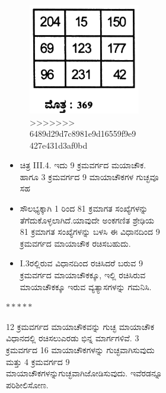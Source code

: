 \begin{figure}[H]
\begin{figure}[H]
\begin{figure}[h]
\begin{figure}[h]
\includegraphics[scale=.8]{src/figures/chap3/fig3.32.jpg}
>>>>>>> 6489d29d7c8981e9d16559f9e9427e431d3af0bd
\end{figure}

\begin{itemize}
	\item ಚಿತ್ರ  III.4. ಇದು 9 ಕ್ರಮವರ್ಗದ ಮಯಾಚೌಕ. ಹಾಗೂ 3 ಕ್ರಮವರ್ಗದ 9 ಮಾಯಾಚೌಕಗಳ ಗುಚ್ಛವೂ ಸಹ
	\item ಸೌಲಭ್ಯಕ್ಕಾಗಿ 1 ರಿಂದ 81 ಕ್ರಮಾಗತ ಸಂಖ್ಯೆಗಳನ್ನು ತೆಗೆದುಕೊಳ್ಳಲಾಗಿದೆ.\break ಯಾವುದೇ ಅಂಕಗಣಿತ ಶ್ರೇಢಿಯ 81 ಕ್ರಮಾಗತ ಸಂಖ್ಯೆಗಳನ್ನು ಬಳಸಿ ಈ ವಿಧಾನ\-ದಿಂದ 9 ಕ್ರಮವರ್ಗದ ಮಾಯಾಚೌಕ ರಚಿಸಬಹುದು.
	\item I.3ರಲ್ಲಿರುವ ವಿಧಾನದಿಂದ ರಚಿಸಿದರೆ ಬರುವ 9 ಕ್ರಮವರ್ಗದ ಮಾಯಾಚೌಕಕ್ಕೂ, ಇಲ್ಲಿ ರಚಿಸಿರುವ ಮಾಯಾಚೌಕಕ್ಕೂ ಇರುವ ವ್ಯತ್ಯಾಸಗಳನ್ನು ಗಮನಿಸಿ.
\end{itemize}
\begin{center}
$*****$
\end{center}

12 ಕ್ರಮವರ್ಗದ ಮಾಯಾಚೌಕವನ್ನು ಗುಚ್ಛ ಮಾಯಾಚೌಕ ವಿಧಾನದಲ್ಲಿ ರಚಿಸಲು\break ಎರಡು ಭಿನ್ನ ಮಾರ್ಗಗಳಿವೆ. 3 ಕ್ರಮವರ್ಗದ 16 ಮಾಯಾಚೌಕಗಳನ್ನು ಗುಚ್ಛವಾಗಿಸು\-ವುದು ಮತ್ತು 4 ಕ್ರಮವರ್ಗದ 9 ಮಾಯಾಚೌಕಗಳನ್ನುಗುಚ್ಛವಾಗಿಜೋಡಿಸುವುದು. ಇವೆರಡನ್ನೂ ಪರಿಶೀಲಿಸೋಣ.


\end{figure}
\end{figure}
\end{figure}
